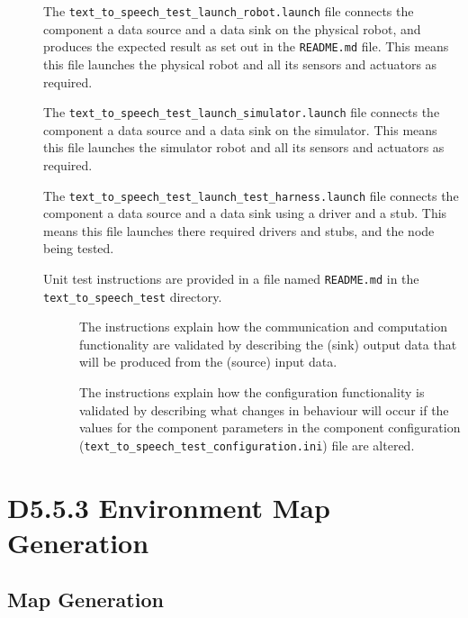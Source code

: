 \documentclass{CSSRforAfrica}
\newcommand{\checkboxChecked}{\fbox{\ding{51}}} %
\newcommand{\checkboxDashed}{\fbox{--}}         %
\begin{document}
\begin{description}
\item[\checkboxChecked] The {\small \verb+text_to_speech_test_launch_robot.launch+} file  connects the component a data source and a data sink on the physical robot, and produces the expected result as set out in the  \small {\texttt{README.md}}   file.    This means this file launches the physical robot and all its sensors and actuators as required.

\item[\checkboxDashed] The {\small \verb+text_to_speech_test_launch_simulator.launch+} file  connects the component a data source and a data sink on the simulator.    This means this file launches the simulator robot and all its sensors and actuators as required.

\item[\checkboxChecked] The {\small \verb+text_to_speech_test_launch_test_harness.launch+} file  connects the component a data source and a data sink using a driver and a stub.   This means this file launches there required drivers and stubs, and the node being tested.

\item[\checkboxChecked] Unit test instructions are provided in a file named {\small \verb+README.md+} in the {\small \verb+text_to_speech_test+} directory.

\begin{description}

\item[\checkboxChecked] The instructions  explain how the  communication and computation functionality are validated by describing the (sink) output data that will be produced from the (source) input data.  

\item[\checkboxChecked] The instructions  explain how the  configuration functionality is validated by describing what changes in behaviour will occur if the values for the component parameters in the component configuration ({\small \verb+text_to_speech_test_configuration.ini+}) file are altered.

\end{description}
\end{description}
\newpage



\section{D5.5.3 Environment Map Generation} 
\subsection{Map Generation} 
\label{subsection:map_generation}
\end{document}
